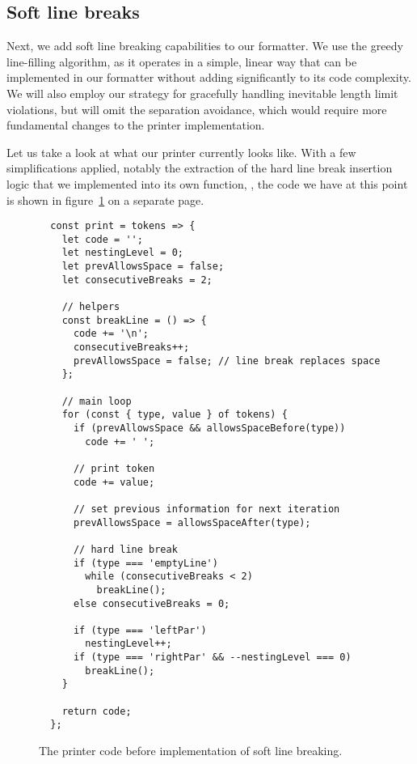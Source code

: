 \subsection{Soft line breaks}
Next, we add soft line breaking capabilities to our formatter.
We use the greedy line-filling algorithm,
as it operates in a simple, linear way
that can be implemented in our formatter without
adding significantly to its code complexity.
We will also employ our strategy for
gracefully handling inevitable length limit violations,
but will omit the separation avoidance,
which would require more fundamental changes
to the printer implementation.

Let us take a look at what our printer currently looks like.
With a few simplifications applied,
notably the extraction of the hard line break insertion logic
that we implemented into its own function, ,
the code we have at this point is shown
in figure~\ref{fig:printerBeforeSoftLineBreaks} on a separate page.

\begin{figure}[p]
  \begin{verbatim}
  const print = tokens => {
    let code = '';
    let nestingLevel = 0;
    let prevAllowsSpace = false;
    let consecutiveBreaks = 2;

    // helpers
    const breakLine = () => {
      code += '\n';
      consecutiveBreaks++;
      prevAllowsSpace = false; // line break replaces space
    };

    // main loop
    for (const { type, value } of tokens) {
      if (prevAllowsSpace && allowsSpaceBefore(type))
        code += ' ';

      // print token
      code += value;

      // set previous information for next iteration
      prevAllowsSpace = allowsSpaceAfter(type);

      // hard line break
      if (type === 'emptyLine')
        while (consecutiveBreaks < 2)
          breakLine();
      else consecutiveBreaks = 0;

      if (type === 'leftPar')
        nestingLevel++;
      if (type === 'rightPar' && --nestingLevel === 0)
        breakLine();
    }

    return code;
  };
  \end{verbatim}
  \caption{The printer code before implementation of
    soft line breaking.}\label{fig:printerBeforeSoftLineBreaks}
\end{figure}

